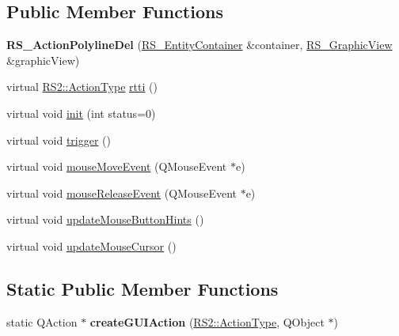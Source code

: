 \subsection*{Public Member Functions}
\begin{DoxyCompactItemize}
\item 
\hypertarget{classRS__ActionPolylineDel_a6ed8ba2428d1ce58b2bdb6c3e67f5967}{{\bfseries R\-S\-\_\-\-Action\-Polyline\-Del} (\hyperlink{classRS__EntityContainer}{R\-S\-\_\-\-Entity\-Container} \&container, \hyperlink{classRS__GraphicView}{R\-S\-\_\-\-Graphic\-View} \&graphic\-View)}\label{classRS__ActionPolylineDel_a6ed8ba2428d1ce58b2bdb6c3e67f5967}

\item 
virtual \hyperlink{classRS2_afe3523e0bc41fd637b892321cfc4b9d7}{R\-S2\-::\-Action\-Type} \hyperlink{classRS__ActionPolylineDel_a01417c1b10a0d49976eb46fb1bfc5375}{rtti} ()
\item 
virtual void \hyperlink{classRS__ActionPolylineDel_a68ba81f6ef76c67cc83841e5d72231bd}{init} (int status=0)
\item 
virtual void \hyperlink{classRS__ActionPolylineDel_a9680e81df75a3b6894812e150ed49c9f}{trigger} ()
\item 
virtual void \hyperlink{classRS__ActionPolylineDel_ab4e18abf343353a22f776d1dcbbde7fc}{mouse\-Move\-Event} (Q\-Mouse\-Event $\ast$e)
\item 
virtual void \hyperlink{classRS__ActionPolylineDel_a35af7f77fb2019bc68fe76070d74a5ab}{mouse\-Release\-Event} (Q\-Mouse\-Event $\ast$e)
\item 
virtual void \hyperlink{classRS__ActionPolylineDel_a10dbf5c2c3bfd3adc351bae178ec4c33}{update\-Mouse\-Button\-Hints} ()
\item 
virtual void \hyperlink{classRS__ActionPolylineDel_a11b87578c754fa0599fc8332d8b3876c}{update\-Mouse\-Cursor} ()
\end{DoxyCompactItemize}
\subsection*{Static Public Member Functions}
\begin{DoxyCompactItemize}
\item 
\hypertarget{classRS__ActionPolylineDel_a3a68820bb2c43db9ea4d109b93dc5a5c}{static Q\-Action $\ast$ {\bfseries create\-G\-U\-I\-Action} (\hyperlink{classRS2_afe3523e0bc41fd637b892321cfc4b9d7}{R\-S2\-::\-Action\-Type}, Q\-Object $\ast$)}\label{classRS__ActionPolylineDel_a3a68820bb2c43db9ea4d109b93dc5a5c}

\end{DoxyCompactItemize}
